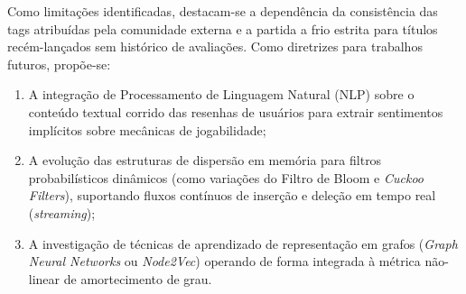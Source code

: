 \documentclass[conference]{IEEEtran}
\begin{document}
Como limitações identificadas, destacam-se a dependência da consistência das tags atribuídas pela comunidade externa e a partida a frio estrita para títulos recém-lançados sem histórico de avaliações. Como diretrizes para trabalhos futuros, propõe-se:
\begin{enumerate}
    \item A integração de Processamento de Linguagem Natural (NLP) sobre o conteúdo textual corrido das resenhas de usuários para extrair sentimentos implícitos sobre mecânicas de jogabilidade;
    \item A evolução das estruturas de dispersão em memória para filtros probabilísticos dinâmicos (como variações do Filtro de Bloom \cite{bloom1970} e \textit{Cuckoo Filters}), suportando fluxos contínuos de inserção e deleção em tempo real (\textit{streaming});
    \item A investigação de técnicas de aprendizado de representação em grafos (\textit{Graph Neural Networks} ou \textit{Node2Vec}) operando de forma integrada à métrica não-linear de amortecimento de grau.
\end{enumerate}
\end{document}
